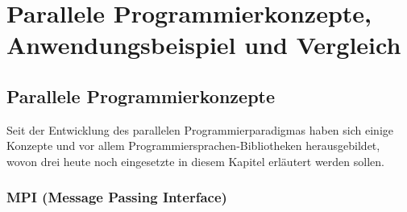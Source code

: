 
\chapter{Parallele Programmierkonzepte, Anwendungsbeispiel und Vergleich}

	\section{Parallele Programmierkonzepte}
	
		Seit der Entwicklung des parallelen Programmierparadigmas haben sich einige Konzepte und vor allem Programmiersprachen-Bibliotheken herausgebildet, wovon drei heute noch eingesetzte in diesem Kapitel erläutert werden sollen.
		
		\subsection{MPI (Message Passing Interface)}
			\label{MPI}


